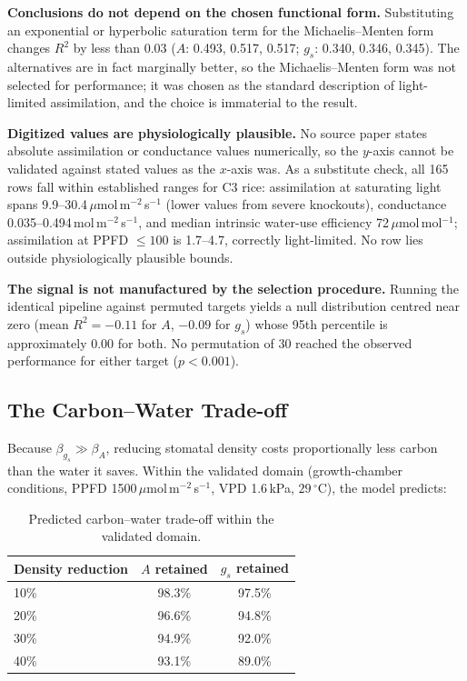 \documentclass[runningheads]{llncs}
\begin{document}
\textbf{Conclusions do not depend on the chosen functional form.} Substituting an exponential or hyperbolic saturation term for the Michaelis--Menten form changes $R^{2}$ by less than 0.03 ($A$: 0.493, 0.517, 0.517; $g_s$: 0.340, 0.346, 0.345). The alternatives are in fact marginally better, so the Michaelis--Menten form was not selected for performance; it was chosen as the standard description of light-limited assimilation, and the choice is immaterial to the result.

\textbf{Digitized values are physiologically plausible.} No source paper states absolute assimilation or conductance values numerically, so the $y$-axis cannot be validated against stated values as the $x$-axis was. As a substitute check, all 165 rows fall within established ranges for C3 rice: assimilation at saturating light spans 9.9--30.4\,$\mu$mol\,m$^{-2}$\,s$^{-1}$ (lower values from severe knockouts), conductance 0.035--0.494\,mol\,m$^{-2}$\,s$^{-1}$, and median intrinsic water-use efficiency 72\,$\mu$mol\,mol$^{-1}$; assimilation at PPFD $\le100$ is 1.7--4.7, correctly light-limited. No row lies outside physiologically plausible bounds.

\textbf{The signal is not manufactured by the selection procedure.} Running the identical pipeline against permuted targets yields a null distribution centred near zero (mean $R^{2}=-0.11$ for $A$, $-0.09$ for $g_s$) whose 95th percentile is approximately $0.00$ for both. No permutation of 30 reached the observed performance for either target ($p<0.001$).

\subsection{The Carbon--Water Trade-off}\label{sec:tradeoff}

Because $\beta_{g_s}\gg\beta_{A}$, reducing stomatal density costs proportionally less carbon than the water it saves. Within the validated domain (growth-chamber conditions, PPFD 1500\,$\mu$mol\,m$^{-2}$\,s$^{-1}$, VPD 1.6\,kPa, $29\,^{\circ}$C), the model predicts:

\begin{table}[t]
\caption{Predicted carbon--water trade-off within the validated domain.}\label{tab:tradeoff}
\centering
\small
\begin{tabular}{lcc}
\toprule
\textbf{Density reduction} & \textbf{$A$ retained} & \textbf{$g_s$ retained} \\
\midrule
10\% & 98.3\% & 97.5\% \\
20\% & 96.6\% & 94.8\% \\
30\% & 94.9\% & 92.0\% \\
40\% & 93.1\% & 89.0\% \\
\bottomrule
\end{tabular}
\end{table}
\end{document}
